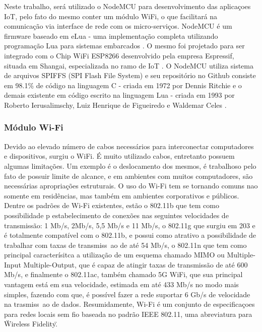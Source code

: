\documentclass[journal]{IEEEtran}
\begin{document}
Neste trabalho, será utilizado o NodeMCU para desenvolvimento das aplicaçoes IoT, pelo fato do mesmo conter um módulo WiFi, o que facilitará na comunicação via interface de rede com os micro-serviços. NodeMCU é um firmware baseado em eLua - uma implementação completa utilizando programação Lua para sistemas embarcados \cite{elua2017}. O mesmo foi projetado para ser integrado com o Chip WiFi ESP8266 desenvolvido pela empresa Espressif, situada em Shangai, especializada no ramo de IoT \cite{systems}. O NodeMCU utiliza sistema de arquivos SPIFFS (SPI Flash File System) e seu repositório no Github consiste em 98.1\% de código na linguagem C - criada em 1972 por Dennis Ritchie \cite{williamstewart2017} e o demais existente em código escrito na linguagem Lua  - criada em 1993 por Roberto Ierusalimschy, Luiz Henrique de Figueiredo e Waldemar Celes \cite{lua2017Authors}.

\subsubsection{Módulo Wi-Fi}

Devido ao elevado número de cabos necessários para interconectar computadores e dispositivos, surgiu o WiFi. É muito utilizado cabos, entretanto possuem algumas limitações. Um exemplo é o deslocamento dos mesmos, é trabalhoso pelo fato de possuir limite de alcance, e em ambientes com muitos computadores, são necessárias apropriações estruturais. O uso do Wi-Fi tem se tornando comuns nao somente em residências, mas também em ambientes corporativos e públicos. Dentre os padrões de Wi-Fi existentes, estão o 802.11b que tem como possibilidade p estabelecimento de conexões nas seguintes velocidades de transmissão: 1 Mb/s, 2Mb/s, 5,5 Mb/s e 11 Mb/s, o 802.11g que surgiu em 203 e é totalmente compatível com o 802.11b, e possui como atrativo a possibilidade de trabalhar com taxas de transmiss~ao de até 54 Mb/s, o 802.11n que tem como principal caracterísitca a utilização de um esquema chamado MIMO ou Multiple-Input Multiple-Output, que é capaz de atingir taxas de transmissão de até 600 Mb/s, e finalmente o 802.11ac, também chamado 5G WiFi, que sua principal vantagem está em sua velocidade, estimada em até 433 Mb/s no modo mais simples, fazendo com que, é possível fazer a rede suportar 6 Gb/s  de velocidade na trasmiss~ao de dados. Resumidamente, Wi-Fi é um conjunto de especificaçoes para redes locais sem fio baseada no padrão IEEE 802.11, uma abreviatura para \"Wireless Fidelity\". \cite{wifiinfowester}
\end{document}

